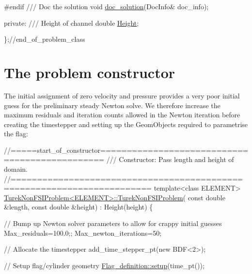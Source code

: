 \begin{DoxyCodeInclude}
\textcolor{preprocessor}{#endif}
\textcolor{comment}{}
\textcolor{comment}{ /// Doc the solution}
\textcolor{comment}{} \textcolor{keywordtype}{void} \hyperlink{classTurekNonFSIProblem_a2f129e4eba71784a58b27d846fdc2a61}{doc\_solution}(DocInfo& doc\_info);


\textcolor{keyword}{private}:
\textcolor{comment}{}
\textcolor{comment}{ /// Height of channel}
\textcolor{comment}{} \textcolor{keywordtype}{double} \hyperlink{classTurekNonFSIProblem_a7e85e76876a9b1136cc340b0bb25e299}{Height};

\};\textcolor{comment}{//end\_of\_problem\_class}

\end{DoxyCodeInclude}




 

\hypertarget{index_constructor}{}\section{The problem constructor}\label{index_constructor}
The initial assignment of zero velocity and pressure provides a very poor initial guess for the preliminary steady Newton solve. We therefore increase the maximum residuals and iteration counts allowed in the Newton iteration before creating the timestepper and setting up the {\ttfamily Geom\+Objects} required to parametrise the flag\+:


\begin{DoxyCodeInclude}
\textcolor{comment}{//=====start\_of\_constructor===============================================}
\textcolor{comment}{/// Constructor: Pass length and height of domain.}
\textcolor{comment}{}\textcolor{comment}{//========================================================================}
\textcolor{keyword}{template}<\textcolor{keyword}{class} ELEMENT>
\hyperlink{classTurekNonFSIProblem_aacb3214544ef81c2f8b49777457e8be6}{TurekNonFSIProblem<ELEMENT>::TurekNonFSIProblem}(
 \textcolor{keyword}{const} \textcolor{keywordtype}{double} &length, \textcolor{keyword}{const} \textcolor{keywordtype}{double} &height) : Height(height)
\{ 

 \textcolor{comment}{// Bump up Newton solver parameters to allow for crappy initial guesses}
 Max\_residuals=100.0;;
 Max\_newton\_iterations=50;

 \textcolor{comment}{// Allocate the timestepper}
 add\_time\_stepper\_pt(\textcolor{keyword}{new} BDF<2>);

 \textcolor{comment}{// Setup flag/cylinder geometry}
 \hyperlink{namespaceFlag__definition_a61a03bffd4a34950ef9892be53c49f89}{Flag\_definition::setup}(time\_pt());

\end{DoxyCodeInclude}


